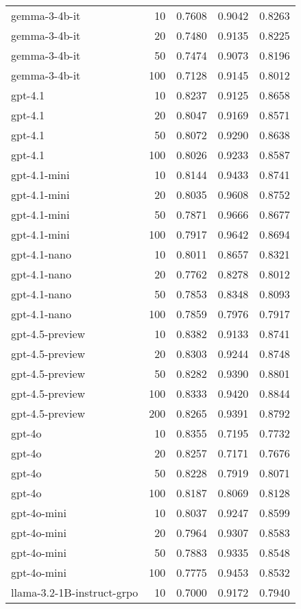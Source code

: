 \begin{tabular}{lrrrr}
gemma-3-4b-it & 10 & 0.7608 & 0.9042 & 0.8263 \\
gemma-3-4b-it & 20 & 0.7480 & 0.9135 & 0.8225 \\
gemma-3-4b-it & 50 & 0.7474 & 0.9073 & 0.8196 \\
gemma-3-4b-it & 100 & 0.7128 & 0.9145 & 0.8012 \\
gpt-4.1 & 10 & 0.8237 & 0.9125 & 0.8658 \\
gpt-4.1 & 20 & 0.8047 & 0.9169 & 0.8571 \\
gpt-4.1 & 50 & 0.8072 & 0.9290 & 0.8638 \\
gpt-4.1 & 100 & 0.8026 & 0.9233 & 0.8587 \\
gpt-4.1-mini & 10 & 0.8144 & 0.9433 & 0.8741 \\
gpt-4.1-mini & 20 & 0.8035 & 0.9608 & 0.8752 \\
gpt-4.1-mini & 50 & 0.7871 & 0.9666 & 0.8677 \\
gpt-4.1-mini & 100 & 0.7917 & 0.9642 & 0.8694 \\
gpt-4.1-nano & 10 & 0.8011 & 0.8657 & 0.8321 \\
gpt-4.1-nano & 20 & 0.7762 & 0.8278 & 0.8012 \\
gpt-4.1-nano & 50 & 0.7853 & 0.8348 & 0.8093 \\
gpt-4.1-nano & 100 & 0.7859 & 0.7976 & 0.7917 \\
gpt-4.5-preview & 10 & 0.8382 & 0.9133 & 0.8741 \\
gpt-4.5-preview & 20 & 0.8303 & 0.9244 & 0.8748 \\
gpt-4.5-preview & 50 & 0.8282 & 0.9390 & 0.8801 \\
gpt-4.5-preview & 100 & 0.8333 & 0.9420 & 0.8844 \\
gpt-4.5-preview & 200 & 0.8265 & 0.9391 & 0.8792 \\
gpt-4o & 10 & 0.8355 & 0.7195 & 0.7732 \\
gpt-4o & 20 & 0.8257 & 0.7171 & 0.7676 \\
gpt-4o & 50 & 0.8228 & 0.7919 & 0.8071 \\
gpt-4o & 100 & 0.8187 & 0.8069 & 0.8128 \\
gpt-4o-mini & 10 & 0.8037 & 0.9247 & 0.8599 \\
gpt-4o-mini & 20 & 0.7964 & 0.9307 & 0.8583 \\
gpt-4o-mini & 50 & 0.7883 & 0.9335 & 0.8548 \\
gpt-4o-mini & 100 & 0.7775 & 0.9453 & 0.8532 \\
llama-3.2-1B-instruct-grpo & 10 & 0.7000 & 0.9172 & 0.7940 \\

\end{tabular}
